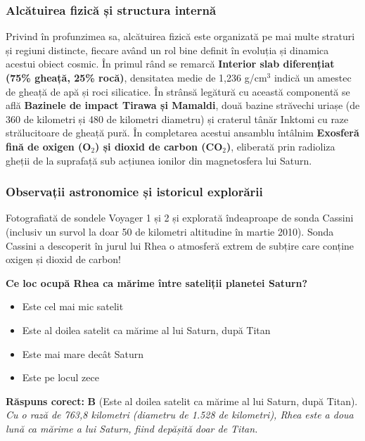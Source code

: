 \subsubsection*{Alcătuirea fizică și structura internă}
Privind în profunzimea sa, alcătuirea fizică este organizată pe mai multe straturi și regiuni distincte, fiecare având un rol bine definit în evoluția și dinamica acestui obiect cosmic. În primul rând se remarcă \textbf{Interior slab diferențiat (75\% gheață, 25\% rocă)}, densitatea medie de 1,236 g/cm$^3$ indică un amestec de gheață de apă și roci silicatice. În strânsă legătură cu această componentă se află \textbf{Bazinele de impact Tirawa și Mamaldi}, două bazine străvechi uriașe (de 360 de kilometri și 480 de kilometri diametru) și craterul tânăr Inktomi cu raze strălucitoare de gheață pură. În completarea acestui ansamblu întâlnim \textbf{Exosferă fină de oxigen (O$_2$) și dioxid de carbon (CO$_2$)}, eliberată prin radioliza gheții de la suprafață sub acțiunea ionilor din magnetosfera lui Saturn.

\subsubsection*{Observații astronomice și istoricul explorării}
Fotografiată de sondele Voyager 1 și 2 și explorată îndeaproape de sonda Cassini (inclusiv un survol la doar 50 de kilometri altitudine în martie 2010). Sonda Cassini a descoperit în jurul lui Rhea o atmosferă extrem de subțire care conține oxigen și dioxid de carbon!

\vspace{6pt}
\begin{tcolorbox}[orbitarquiz, title={\textbf{Întrebare de verificare \#19: Rhea}}]
\textbf{Ce loc ocupă Rhea ca mărime între sateliții planetei Saturn?}
\begin{itemize}[leftmargin=2.2em, itemsep=2pt, topsep=4pt]
  \item[$\square$ \textbf{A.}] Este cel mai mic satelit
  \item[$\square$ \textbf{B.}] Este al doilea satelit ca mărime al lui Saturn, după Titan
  \item[$\square$ \textbf{C.}] Este mai mare decât Saturn
  \item[$\square$ \textbf{D.}] Este pe locul zece
\end{itemize}
\vspace{2pt}
{\footnotesize\color{orbitarMuted}\textbf{Răspuns corect:} \textbf{B} (Este al doilea satelit ca mărime al lui Saturn, după Titan). \emph{Cu o rază de 763,8 kilometri (diametru de 1.528 de kilometri), Rhea este a doua lună ca mărime a lui Saturn, fiind depășită doar de Titan.}}
\end{tcolorbox}
\clearpage


